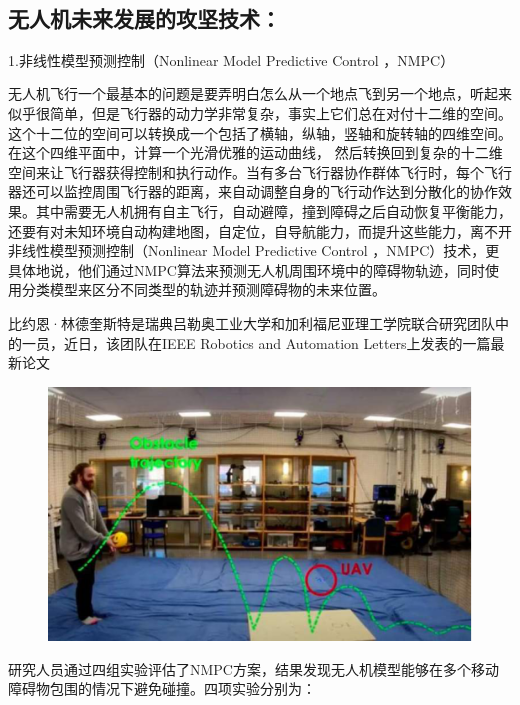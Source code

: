 \documentclass{article}
\begin{document}
\subsection{无人机未来发展的攻坚技术：}
1.非线性模型预测控制（Nonlinear Model Predictive Control ，NMPC）\citep{9}\par
无人机飞行一个最基本的问题是要弄明白怎么从一个地点飞到另一个地点，听起来似乎很简单，但是飞行器的动力学非常复杂，事实上它们总在对付十二维的空间。这个十二位的空间可以转换成一个包括了横轴，纵轴，竖轴和旋转轴的四维空间。在这个四维平面中，计算一个光滑优雅的运动曲线， 然后转换回到复杂的十二维空间来让飞行器获得控制和执行动作。当有多台飞行器协作群体飞行时，每个飞行器还可以监控周围飞行器的距离，来自动调整自身的飞行动作达到分散化的协作效果。其中需要无人机拥有自主飞行，自动避障，撞到障碍之后自动恢复平衡能力，还要有对未知环境自动构建地图，自定位，自导航能力，而提升这些能力，离不开非线性模型预测控制（Nonlinear Model Predictive Control ，NMPC）技术，更具体地说，他们通过NMPC算法来预测无人机周围环境中的障碍物轨迹，同时使用分类模型来区分不同类型的轨迹并预测障碍物的未来位置。\par
比约恩·林德奎斯特是瑞典吕勒奥工业大学和加利福尼亚理工学院联合研究团队中的一员，近日，该团队在IEEE Robotics and Automation Letters上发表的一篇最新论文\par

\par
\begin{figure}[h!]
\centering
\includegraphics[scale=0.3]{3}
\label{fig:3}
\end{figure}


研究人员通过四组实验评估了NMPC方案，结果发现无人机模型能够在多个移动障碍物包围的情况下避免碰撞。四项实验分别为：\par
\end{document}
